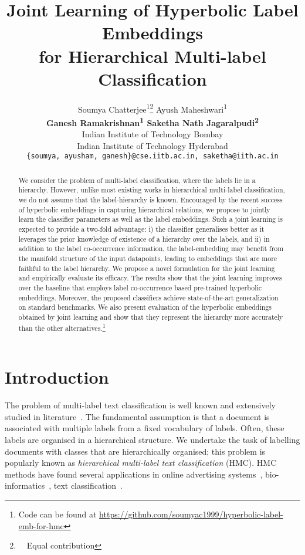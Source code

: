 \documentclass[11pt,a4paper]{article}
\title{Joint Learning of Hyperbolic Label Embeddings\\ for Hierarchical Multi-label Classification}
\author{
Soumya Chatterjee\textsuperscript{\rm 1}\thanks{~~Equal contribution} \hspace{0.4em} Ayush Maheshwari\textsuperscript{\rm 1}\footnotemark[1] \\
\textbf{Ganesh Ramakrishnan\textsuperscript{\rm 1} \hspace{0.4em} Saketha Nath Jagaralpudi\textsuperscript{\rm 2}}\\
 Indian Institute of Technology Bombay\\
 Indian Institute of Technology Hyderabad \\
\texttt{\{soumya, ayusham, ganesh\}@cse.iitb.ac.in, saketha@iith.ac.in}
}
\date{}
\begin{document}
\maketitle
\begin{abstract}
We consider the problem of multi-label classification, where the labels lie in a hierarchy. However, unlike most existing works in hierarchical multi-label classification, we do not assume that the label-hierarchy is known. Encouraged by the recent success of hyperbolic embeddings in capturing hierarchical relations, we propose to jointly learn the classifier parameters as well as the label embeddings. Such a joint learning is expected to provide a two-fold advantage: i) the classifier generalises better as it leverages the prior knowledge of existence of a hierarchy over the labels, and ii) in addition to the label co-occurrence information, the label-embedding may benefit from the manifold structure of the input datapoints, leading to embeddings that are more faithful to the label hierarchy. We propose a novel formulation for the joint learning and empirically evaluate its efficacy. The results show that the joint learning improves over the baseline that employs label co-occurrence based pre-trained hyperbolic embeddings. Moreover, the proposed classifiers achieve state-of-the-art generalization on standard benchmarks. We also present evaluation of the hyperbolic embeddings obtained by joint learning and show that they represent the hierarchy more accurately than the other alternatives.\footnote{Code can be found at \url{https://github.com/soumyac1999/hyperbolic-label-emb-for-hmc}}
\end{abstract}

\section{Introduction}
The problem of multi-label text classification is well known and extensively studied in literature~\citep{mccallum1999multi,yang2009effective,liu2017deep}. The fundamental assumption is that a document is associated with multiple labels from a fixed vocabulary of labels. Often, these labels are organised in a hierarchical structure. We undertake the task of labelling documents with classes that are hierarchically organised; this problem is popularly known as \textit{hierarchical multi-label text classification} (HMC). HMC methods have found several applications in online advertising systems~\citep{agrawal2013multi}, bio-informatics~\citep{peng2016deepmesh, triguero2016labelling}, text classification~\citep{rousu2006kernel, emnlp}.
\end{document}

